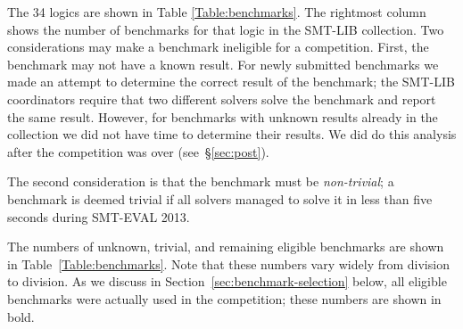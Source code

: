 \documentclass[twoside,11pt]{article}
\begin{document}
The 34 logics are shown in Table \ref{Table:benchmarks}. The rightmost column shows the number of benchmarks for that logic in the SMT-LIB collection. Two considerations may make a benchmark ineligible for a competition. First, the benchmark may not have a known result. For newly submitted benchmarks
we made an attempt to determine the correct result of the benchmark; the SMT-LIB coordinators require that two
different solvers solve the benchmark and report the same result. However, for benchmarks with unknown results already in the collection we did not have time to determine their results. We did do this analysis after the competition was over (see~\S\ref{sec:post}).

The second consideration is that the benchmark must be \emph{non-trivial}; a benchmark is deemed trivial if all solvers managed to solve it in less than five seconds during SMT-EVAL 2013.

The numbers of unknown, trivial, and remaining eligible benchmarks are shown in Table~\ref{Table:benchmarks}.  Note that these numbers vary widely from division to division.  As we discuss in Section~\ref{sec:benchmark-selection} below, all eligible benchmarks were actually used in the competition; these numbers are shown in bold.  
\end{document}
